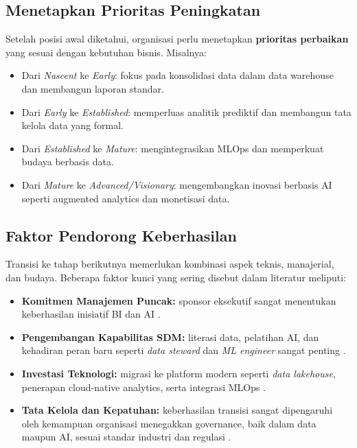 \subsection*{Menetapkan Prioritas Peningkatan}
Setelah posisi awal diketahui, organisasi perlu menetapkan \textbf{prioritas perbaikan} yang sesuai 
dengan kebutuhan bisnis. Misalnya:  
\begin{itemize}
	\item Dari \textit{Nascent} ke \textit{Early}: fokus pada konsolidasi data dalam data warehouse 
	dan membangun laporan standar.  
	\item Dari \textit{Early} ke \textit{Established}: memperluas analitik prediktif dan membangun 
	tata kelola data yang formal.  
	\item Dari \textit{Established} ke \textit{Mature}: mengintegrasikan MLOps dan memperkuat budaya 
	berbasis data.  
	\item Dari \textit{Mature} ke \textit{Advanced/Visionary}: mengembangkan inovasi berbasis AI 
	seperti augmented analytics dan monetisasi data.  
\end{itemize}

\subsection*{Faktor Pendorong Keberhasilan}
Transisi ke tahap berikutnya memerlukan kombinasi aspek teknis, manajerial, dan budaya. 
Beberapa faktor kunci yang sering disebut dalam literatur meliputi:
\begin{itemize}
	\item \textbf{Komitmen Manajemen Puncak:} sponsor eksekutif sangat menentukan keberhasilan 
	inisiatif BI dan AI \cite{yeoh2008biimplement}.  
	\item \textbf{Pengembangan Kapabilitas SDM:} literasi data, pelatihan AI, dan kehadiran peran 
	baru seperti \textit{data steward} dan \textit{ML engineer} sangat penting 
	\cite{lim2023adoption}.  
	\item \textbf{Investasi Teknologi:} migrasi ke platform modern seperti \textit{data lakehouse}, 
	penerapan cloud-native analytics, serta integrasi MLOps \cite{armbrust2021lakehouse}.  
	\item \textbf{Tata Kelola dan Kepatuhan:} keberhasilan transisi sangat dipengaruhi oleh 
	kemampuan organisasi menegakkan governance, baik dalam data maupun AI, sesuai standar 
	industri dan regulasi \cite{zwitter2014}.  
\end{itemize}


